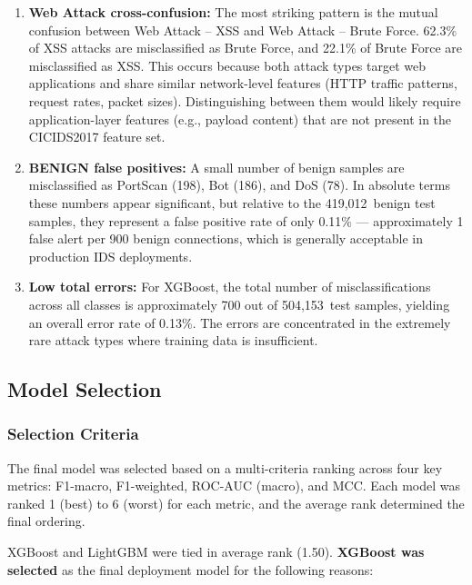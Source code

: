 \documentclass[12pt, a4paper]{article}
\begin{document}
\begin{enumerate}
    \item \textbf{Web Attack cross-confusion:} The most striking pattern is the mutual confusion between Web Attack -- XSS and Web Attack -- Brute Force.
    62.3\% of XSS attacks are misclassified as Brute Force, and 22.1\% of Brute Force are misclassified as XSS.
    This occurs because both attack types target web applications and share similar network-level features (HTTP traffic patterns, request rates, packet sizes).
    Distinguishing between them would likely require application-layer features (e.g., payload content) that are not present in the CICIDS2017 feature set.

    \item \textbf{BENIGN false positives:} A small number of benign samples are misclassified as PortScan (198), Bot (186), and DoS (78).
    In absolute terms these numbers appear significant, but relative to the 419,012~benign test samples, they represent a false positive rate of only 0.11\% --- approximately 1 false alert per 900 benign connections, which is generally acceptable in production IDS deployments.

    \item \textbf{Low total errors:} For XGBoost, the total number of misclassifications across all classes is approximately 700 out of 504,153~test samples, yielding an overall error rate of 0.13\%.
    The errors are concentrated in the extremely rare attack types where training data is insufficient.
\end{enumerate}


\subsection{Model Selection}

\subsubsection{Selection Criteria}
The final model was selected based on a multi-criteria ranking across four key metrics: F1-macro, F1-weighted, ROC-AUC (macro), and MCC.
Each model was ranked 1 (best) to 6 (worst) for each metric, and the average rank determined the final ordering.

XGBoost and LightGBM were tied in average rank (1.50).
\textbf{XGBoost was selected} as the final deployment model for the following reasons:
\end{document}

